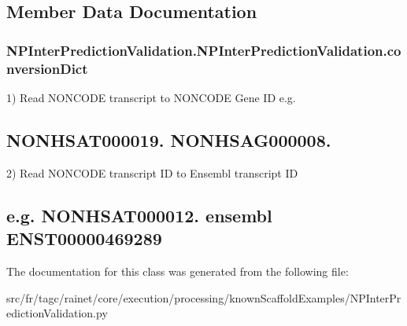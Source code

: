 \subsection{Member Data Documentation}
\hypertarget{classNPInterPredictionValidation_1_1NPInterPredictionValidation_aacd479a71f1a21704b6f7ff636a20885}{
\subsubsection[{conversion\-Dict}]{\setlength{\rightskip}{0pt plus 5cm}N\-P\-Inter\-Prediction\-Validation.\-N\-P\-Inter\-Prediction\-Validation.\-conversion\-Dict}}\label{classNPInterPredictionValidation_1_1NPInterPredictionValidation_aacd479a71f1a21704b6f7ff636a20885}


1) Read N\-O\-N\-C\-O\-D\-E transcript to N\-O\-N\-C\-O\-D\-E Gene I\-D e.\-g. 

\subsection*{N\-O\-N\-H\-S\-A\-T000019. N\-O\-N\-H\-S\-A\-G000008. }

2) Read N\-O\-N\-C\-O\-D\-E transcript I\-D to Ensembl transcript I\-D \subsection*{e.\-g. N\-O\-N\-H\-S\-A\-T000012. ensembl E\-N\-S\-T00000469289 }

The documentation for this class was generated from the following file\-:\begin{DoxyCompactItemize}
\item 
src/fr/tagc/rainet/core/execution/processing/known\-Scaffold\-Examples/N\-P\-Inter\-Prediction\-Validation.\-py\end{DoxyCompactItemize}
